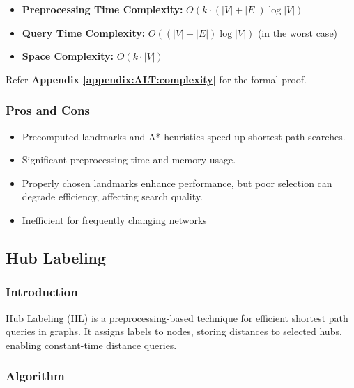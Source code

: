 				\begin{itemize}
					\item \textbf{Preprocessing Time Complexity:} $ O(k \cdot (|V| + |E|) \log |V|) $
					\item \textbf{Query Time Complexity:} $ O((|V| + |E|) \log |V|) $  (in the worst case)
					\item \textbf{Space Complexity:} $ O(k \cdot |V|) $
				\end{itemize}


				Refer \textbf{Appendix \ref{appendix:ALT:complexity}} for the formal proof. \medskip
				
		\subsubsection{Pros and Cons}
		\begin{itemize}
			\item Precomputed landmarks and A* heuristics speed up shortest path searches.
			\item Significant preprocessing time and memory usage.
			\item Properly chosen landmarks enhance performance, but poor selection can degrade efficiency, affecting search quality.
			\item Inefficient for frequently changing networks
		\end{itemize}




	\subsection{Hub Labeling}

		\subsubsection{Introduction}
		Hub Labeling (HL) is a preprocessing-based technique for efficient shortest path queries in graphs. It assigns labels to nodes, storing distances to selected hubs, enabling constant-time distance queries.
		
			\subsubsection{Algorithm}

